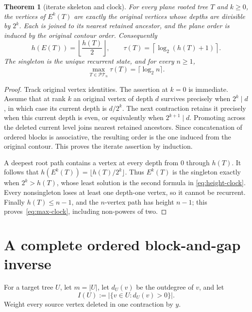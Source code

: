 \documentclass[a4paper,10pt]{amsart}
\newtheorem{theorem}{Theorem}
\theoremstyle{definition}
\theoremstyle{remark}
\newcommand{\PT}{\mathcal{PT}}
\begin{document}
\begin{theorem}[iterate skeleton and clock]\label{thm:clock}
For every plane rooted tree $T$ and $k\ge0$, the vertices of $E^k(T)$ are
exactly the original vertices whose depths are divisible by $2^k$.  Each is
joined to its nearest retained ancestor, and the plane order is induced by
the original contour order.  Consequently
\begin{equation}\label{eq:height-clock}
 h(E(T))=\left\lfloor\frac{h(T)}2\right\rfloor,
 \qquad
 \tau(T)=\left\lceil\log_2(h(T)+1)\right\rceil.
\end{equation}
The singleton is the unique recurrent state, and for every $n\ge1$,
\begin{equation}\label{eq:max-clock}
       \max_{T\in\PT_n}\tau(T)=\lceil\log_2n\rceil.
\end{equation}
\end{theorem}

\begin{proof}
Track original vertex identities.  The assertion at $k=0$ is immediate.
Assume that at rank $k$ an original vertex of depth $d$ survives precisely
when $2^k\mid d$, in which case its current depth is $d/2^k$.  The next
contraction retains it precisely when this current depth is even, or
equivalently when $2^{k+1}\mid d$.  Promoting across the deleted current
level joins nearest retained ancestors.  Since concatenation of ordered
blocks is associative, the resulting order is the one induced from the
original contour.  This proves the iterate assertion by induction.

A deepest root path contains a vertex at every depth from $0$ through $h(T)$.
It follows that
$h(E^k(T))=\lfloor h(T)/2^k\rfloor$.  Thus $E^k(T)$ is the singleton exactly
when $2^k>h(T)$, whose least solution is the second formula in
\eqref{eq:height-clock}.  Every nonsingleton loses at least one depth-one
vertex, so it cannot be recurrent.  Finally $h(T)\le n-1$, and the
$n$-vertex path has height $n-1$; this proves~\eqref{eq:max-clock}, including
non-powers of two.
\end{proof}

\section{A complete ordered block-and-gap inverse}

For a target tree $U$, let $m=|U|$, let $d_U(v)$ be the outdegree of $v$, and
let
\[
           I(U):=|\{v\in U:d_U(v)>0\}|.
\]
Weight every source vertex deleted in one contraction by $y$.
\end{document}
